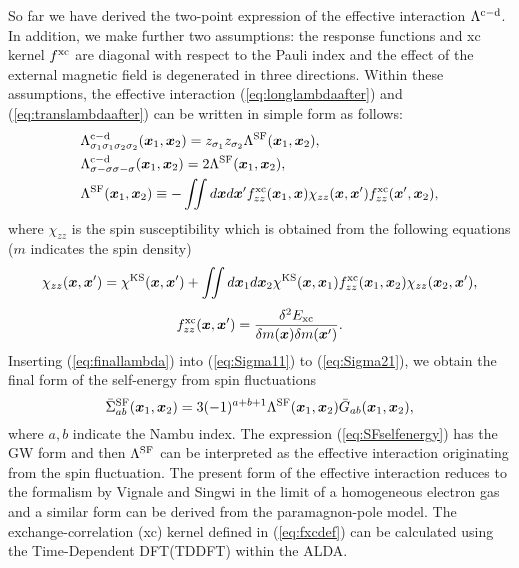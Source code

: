 So far we have derived the two-point expression of the effective interaction $\Lambda^{\rm c - \rm d}$.
In addition, we make further two assumptions: the response functions and xc kernel $f^{\rm xc}$ are
diagonal with respect to the Pauli index and the effect of the external magnetic field is degenerated
in three directions. Within these assumptions, the effective interaction (\ref{eq:longlambdaafter}) and
(\ref{eq:translambdaafter}) can be written in simple form as follows:
%
\begin{equation}
	\begin{split}
	&\Lambda^{\rm c - \rm d}_{\sigma_1\sigma_1\sigma_2\sigma_2}(\bm x_1, \bm x_2) = 
	z_{\sigma_1}z_{\sigma_2}\Lambda^{\rm SF}(\bm x_1,\bm x_2), \\
	&\Lambda^{\rm c - \rm d}_{\sigma-\sigma\sigma-\sigma}(\bm x_1, \bm x_2) = 
	2\Lambda^{\rm SF}(\bm x_1,\bm x_2), \\
	&\Lambda^{\rm SF}(\bm x_1,\bm x_2) \equiv -\iint d\bm x d\bm x'
	f^{\rm xc}_{zz}(\bm x_1,\bm x)\chi_{zz}(\bm x,\bm x')f^{\rm xc}_{zz}(\bm x',\bm x_2),
	\label{eq:finallambda}
\end{split}
\end{equation}
%
where $\chi_{zz}$ is the spin susceptibility which is obtained from the following equations
($m$ indicates the spin density)
%
\begin{equation}
	\chi_{zz}(\bm x,\bm x') = \chi^{\rm KS}(\bm x,\bm x') + 
	\iint d\bm x_1 d\bm x_2 \chi^{\rm KS}(\bm x, \bm x_1)f^{\rm xc}_{zz}(\bm x_1, \bm x_2)
	\chi_{zz}(\bm x_2,\bm x'),
	\label{eq:chis}
\end{equation}
%
\begin{equation}
	f^{\rm xc}_{zz}(\bm x,\bm x') = \frac{\delta^2 E_{\rm xc}}{\delta m(\bm x) \delta m(\bm x')}.
	\label{eq:fxcdef}
\end{equation}
%
Inserting (\ref{eq:finallambda}) into (\ref{eq:Sigma11}) to (\ref{eq:Sigma21}), we obtain the 
final form of the self-energy from spin fluctuations
%
\begin{equation}
	\bar{\Sigma}^{\rm SF}_{ab}(\bm x_1,\bm x_2) = 3(-1)^{a+b+1}
	\Lambda^{\rm SF}(\bm x_1, \bm x_2) \bar{G}_{ab}(\bm x_1, \bm x_2),
	\label{eq:SFselfenergy}
\end{equation}
%
where $a, b$ indicate the Nambu index.
The expression (\ref{eq:SFselfenergy}) has the GW form and then $\Lambda^{\rm SF}$ can be interpreted
as the effective interaction originating from the spin fluctuation.
The present form of the effective interaction reduces to the formalism by Vignale and Singwi\cite{Vignale1985} 
in the limit of a homogeneous electron gas and a similar form can be derived from the 
paramagnon-pole model\cite{Zhu1986}.
The exchange-correlation (xc) kernel defined in (\ref{eq:fxcdef}) can be calculated using the Time-Dependent DFT(TDDFT)
\cite{Runge1984} within the ALDA.

